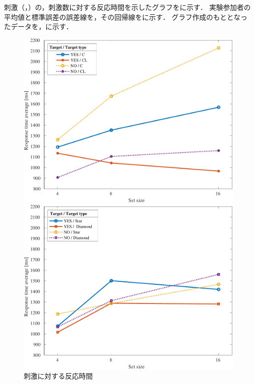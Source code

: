 \section{\result}
刺激（，）の，刺激数に対する反応時間を示したグラフをに示す．
実験参加者の平均値と標準誤差の誤差線を，その回帰線をに示す．
グラフ作成のもととなったデータを，に示す．
\begin{figure}[H]
    \centering
    \begin{minipage}[b]{.49\textwidth}
        \centering
        \includegraphics[keepaspectratio,width=\textwidth]{../../Figures/13_01_graph.pdf}
    \end{minipage}
    \begin{minipage}[b]{.49\textwidth}
        \centering
        \includegraphics[keepaspectratio,width=\textwidth]{../../Figures/13_02_graph.pdf}
    \end{minipage}
    \caption{刺激に対する反応時間}
    \label{fig:刺激対の刺激数に対する反応時間}
\end{figure}
